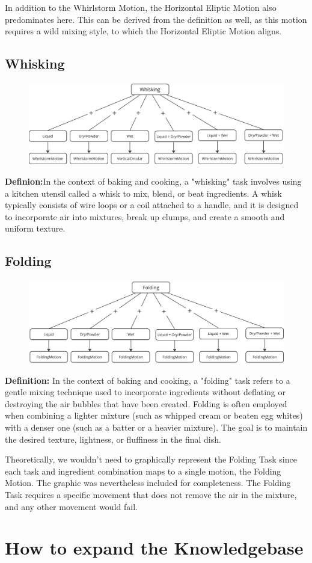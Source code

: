 In addition to the Whirlstorm Motion, the Horizontal Eliptic Motion also predominates here. This can be derived from the definition as well, as this motion requires a wild mixing style, to which the Horizontal Eliptic Motion aligns.
\subsection{Whisking}
\begin{figure}[H]
    \includegraphics[scale=0.18]{Graphics/WhiskingDecisionTree.jpg}
    \end{figure}
\textbf{Definion:}In the context of baking and cooking, a "whisking" task involves using a kitchen utensil called a whisk to mix, blend, or beat ingredients. A whisk typically consists of wire loops or a coil attached to a handle, and it is designed to incorporate air into mixtures, break up clumps, and create a smooth and uniform texture.

\subsection{Folding}
\begin{figure}[H]
    \includegraphics[scale=0.18]{Graphics/FoldingDecisionTree.jpg}
    \end{figure}
\textbf{Definition:}
In the context of baking and cooking, a "folding" task refers to a gentle mixing technique used to incorporate ingredients without deflating or destroying the air bubbles that have been created. Folding is often employed when combining a lighter mixture (such as whipped cream or beaten egg whites) with a denser one (such as a batter or a heavier mixture). The goal is to maintain the desired texture, lightness, or fluffiness in the final dish.

Theoretically, we wouldn't need to graphically represent the Folding Task since each task and ingredient combination maps to a single motion, the Folding Motion. The graphic was nevertheless included for completeness. The Folding Task requires a specific movement that does not remove the air in the mixture, and any other movement would fail.
\section{How to expand the Knowledgebase}